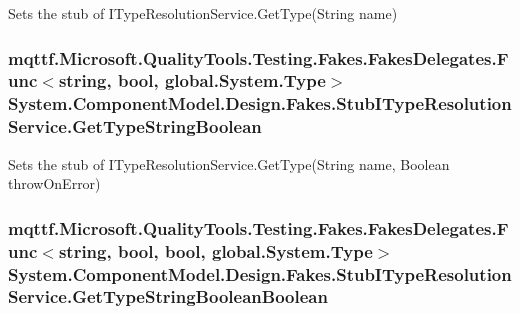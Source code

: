 Sets the stub of I\-Type\-Resolution\-Service.\-Get\-Type(\-String name)

\hypertarget{class_system_1_1_component_model_1_1_design_1_1_fakes_1_1_stub_i_type_resolution_service_a6b304aef6de1197c409609f420eeaebd}{
\subsubsection[{Get\-Type\-String\-Boolean}]{\setlength{\rightskip}{0pt plus 5cm}mqttf.\-Microsoft.\-Quality\-Tools.\-Testing.\-Fakes.\-Fakes\-Delegates.\-Func$<$string, bool, global.\-System.\-Type$>$ System.\-Component\-Model.\-Design.\-Fakes.\-Stub\-I\-Type\-Resolution\-Service.\-Get\-Type\-String\-Boolean}}\label{class_system_1_1_component_model_1_1_design_1_1_fakes_1_1_stub_i_type_resolution_service_a6b304aef6de1197c409609f420eeaebd}


Sets the stub of I\-Type\-Resolution\-Service.\-Get\-Type(\-String name, Boolean throw\-On\-Error)

\hypertarget{class_system_1_1_component_model_1_1_design_1_1_fakes_1_1_stub_i_type_resolution_service_ace763f0294ae2e19bff2b48c10bc60ff}{
\subsubsection[{Get\-Type\-String\-Boolean\-Boolean}]{\setlength{\rightskip}{0pt plus 5cm}mqttf.\-Microsoft.\-Quality\-Tools.\-Testing.\-Fakes.\-Fakes\-Delegates.\-Func$<$string, bool, bool, global.\-System.\-Type$>$ System.\-Component\-Model.\-Design.\-Fakes.\-Stub\-I\-Type\-Resolution\-Service.\-Get\-Type\-String\-Boolean\-Boolean}}\label{class_system_1_1_component_model_1_1_design_1_1_fakes_1_1_stub_i_type_resolution_service_ace763f0294ae2e19bff2b48c10bc60ff}



